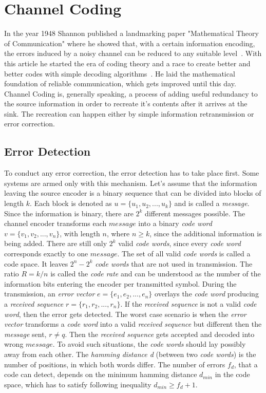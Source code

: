 \section{Channel Coding} \label{sec:cod}
In the year 1948 Shannon published a landmarking paper "Mathematical Theory of Communication" where he showed that, with a certain information encoding, the errors induced by a noisy channel can be reduced to any suitable level~\cite{art:Shannon}. With this article he started the era of coding theory and a race to create better and better codes with simple decoding algorithms~\cite{book:Lint}. He laid the mathematical foundation of reliable communication, which gets improved until this day.\\
Channel Coding is, generally speaking, a process of adding useful redundancy to the source information in order to recreate it's contents after it arrives at the sink. The recreation can happen either by simple information retransmission or error correction.
\subsection{Error Detection}
To conduct any error correction, the error detection has to take place first. Some systems are armed only with this mechanism. Let's assume that the information leaving the source encoder is a binary sequence that can be divided into blocks of length $k$. Each block is denoted as $u=\{u_1,u_2,...,u_k\}$ and is called a \textit{message}. Since the information is binary, there are $2^k$ different messages possible. The channel encoder transforms each $message$ into a binary \textit{code word} $v=\{v_1,v_2,...,v_n\}$, with length $n$, where $n\geq k$, since the additional information is being added. There are still only $2^k$ valid \textit{code words}, since every \textit{code word} corresponds exactly to one $message$. The set of all valid \textit{code words} is called a code space. It leaves $2^n - 2^k$ \textit{code words} that are not used in transmission. The ratio $R=k/n$ is called the \textit{code rate} and can be understood as the number of the information bits entering the encoder per transmitted symbol. During the transmission, an \textit{error vector} $e=\{e_1,e_2,...,e_n\}$ overlays the \textit{code word} producing a \textit{received sequence} $r=\{r_1,r_2,...,r_n\}$. If the \textit{received sequence} is not a valid \textit{code word}, then the error gets detected. The worst case scenario is when the \textit{error vector} transforms a \textit{code word} into a valid \textit{received sequence} but different then the \textit{message} sent, $r\neq q$. Then the \textit{received sequence} gets accepted and decoded into wrong $message$. To avoid such situations, the \textit{code words} should lay possibly away from each other. The \textit{hamming distance d} (between two \textit{code words}) is the number of positions, in which both words differ. The number of errors $f_d$, that a code can detect, depends on the minimum hamming distance $d_{min}$ in the code space, which has to satisfy following inequality $d_{min} \geq f_d + 1$.
